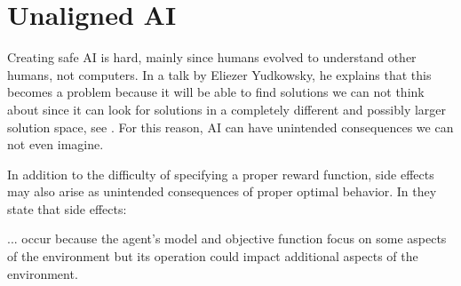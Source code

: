 \documentclass[12pt,A4]{report}
\newcommand{\autobaj}{}
\theoremstyle{definition}
\begin{document}




\section{Unaligned AI}
Creating safe AI is hard, mainly since humans evolved to understand other humans, not computers. In a talk by Eliezer Yudkowsky, he explains that this becomes a problem because it will be able to find solutions we can not think about since it can look for solutions in a completely different and possibly larger solution space, see \citet{Yudkowsky16}. For this reason, AI can have unintended consequences we can not even imagine. 

In addition to the difficulty of specifying a proper reward function, side effects may also arise as unintended consequences of proper optimal behavior. In \citet{Saisubramanian} they state that side effects:
\begin{displayquote}
  ... occur because the agent's model and objective function focus on some aspects of the environment but its operation could impact additional aspects of the environment.
\end{displayquote}
\end{document}
